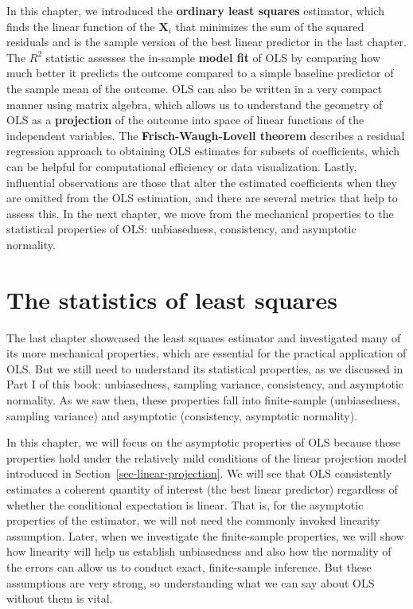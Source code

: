 \documentclass[
  13pt,
  letterpaper,
  DIV=11,
  numbers=noendperiod]{scrreprt}
\newcommand{\mb}{\symbf}
\newcommand{\X}{\mb{X}}
\theoremstyle{definition}
\theoremstyle{definition}
\theoremstyle{plain}
\theoremstyle{remark}
\begin{document}
In this chapter, we introduced the \textbf{ordinary least squares}
estimator, which finds the linear function of the \(\X_i\) that
minimizes the sum of the squared residuals and is the sample version of
the best linear predictor in the last chapter. The \(R^2\) statistic
assesses the in-sample \textbf{model fit} of OLS by comparing how much
better it predicts the outcome compared to a simple baseline predictor
of the sample mean of the outcome. OLS can also be written in a very
compact manner using matrix algebra, which allows us to understand the
geometry of OLS as a \textbf{projection} of the outcome into space of
linear functions of the independent variables. The
\textbf{Frisch-Waugh-Lovell theorem} describes a residual regression
approach to obtaining OLS estimates for subsets of coefficients, which
can be helpful for computational efficiency or data visualization.
Lastly, influential observations are those that alter the estimated
coefficients when they are omitted from the OLS estimation, and there
are several metrics that help to assess this. In the next chapter, we
move from the mechanical properties to the statistical properties of
OLS: unbiasedness, consistency, and asymptotic normality.

\chapter{The statistics of least squares}\label{sec-ols-statistics}

The last chapter showcased the least squares estimator and investigated
many of its more mechanical properties, which are essential for the
practical application of OLS. But we still need to understand its
statistical properties, as we discussed in Part I of this book:
unbiasedness, sampling variance, consistency, and asymptotic normality.
As we saw then, these properties fall into finite-sample (unbiasedness,
sampling variance) and asymptotic (consistency, asymptotic normality).

In this chapter, we will focus on the asymptotic properties of OLS
because those properties hold under the relatively mild conditions of
the linear projection model introduced in
Section~\ref{sec-linear-projection}. We will see that OLS consistently
estimates a coherent quantity of interest (the best linear predictor)
regardless of whether the conditional expectation is linear. That is,
for the asymptotic properties of the estimator, we will not need the
commonly invoked linearity assumption. Later, when we investigate the
finite-sample properties, we will show how linearity will help us
establish unbiasedness and also how the normality of the errors can
allow us to conduct exact, finite-sample inference. But these
assumptions are very strong, so understanding what we can say about OLS
without them is vital.
\end{document}
